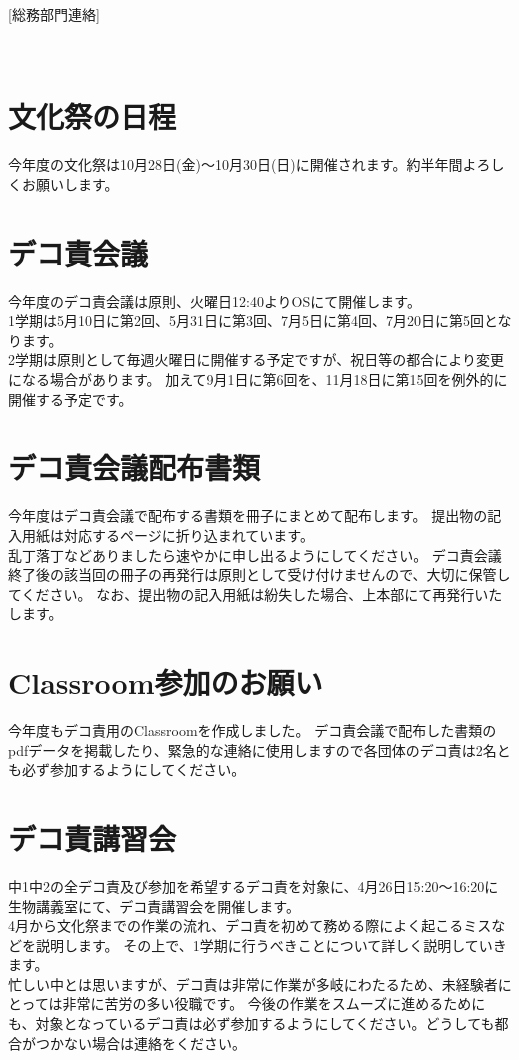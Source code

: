 \newpage
\pagestyle{booklet}
[総務部門連絡]
\begin{multicols*}{2}
　\\
\vspace{-15mm}
\section{文化祭の日程}
\indent 今年度の文化祭は10月28日(金)〜10月30日(日)に開催されます。約半年間よろしくお願いします。

\section{デコ責会議}
\indent 今年度のデコ責会議は原則、火曜日12:40よりOSにて開催します。\\
\indent 1学期は5月10日に第2回、5月31日に第3回、7月5日に第4回、7月20日に第5回となります。\\
\indent 2学期は原則として毎週火曜日に開催する予定ですが、祝日等の都合により変更になる場合があります。
加えて9月1日に第6回を、11月18日に第15回を例外的に開催する予定です。

\section{デコ責会議配布書類}
\indent 今年度はデコ責会議で配布する書類を冊子にまとめて配布します。
提出物の記入用紙は対応するページに折り込まれています。\\
\indent 乱丁落丁などありましたら速やかに申し出るようにしてください。
デコ責会議終了後の該当回の冊子の再発行は原則として受け付けませんので、大切に保管してください。
なお、提出物の記入用紙は紛失した場合、上本部にて再発行いたします。

\section{Classroom参加のお願い}
\indent 今年度もデコ責用のClassroomを作成しました。
デコ責会議で配布した書類のpdfデータを掲載したり、緊急的な連絡に使用しますので各団体のデコ責は2名とも必ず参加するようにしてください。

\section{デコ責講習会}
\indent 中1中2の全デコ責及び参加を希望するデコ責を対象に、4月26日15:20〜16:20に生物講義室にて、デコ責講習会を開催します。\\
\indent 4月から文化祭までの作業の流れ、デコ責を初めて務める際によく起こるミスなどを説明します。
その上で、1学期に行うべきことについて詳しく説明していきます。\\
\indent 忙しい中とは思いますが、デコ責は非常に作業が多岐にわたるため、未経験者にとっては非常に苦労の多い役職です。
今後の作業をスムーズに進めるためにも、対象となっているデコ責は必ず参加するようにしてください。どうしても都合がつかない場合は連絡をください。


\end{multicols*}
